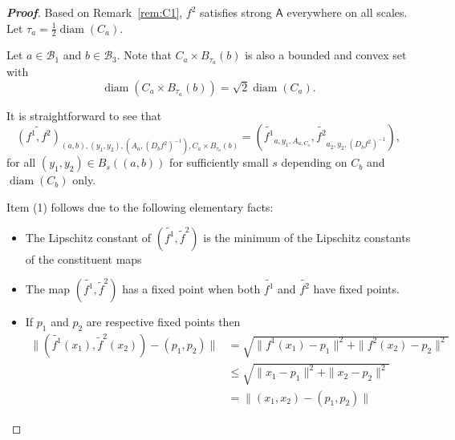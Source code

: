 \documentclass[a4, 12pt,leqno]{amsart}
\theoremstyle{plain}
\theoremstyle{definition}
\theoremstyle{remark}
\numberwithin{equation}{section}
\newcommand{\B}{\mathcal{B}}
\DeclareMathOperator{\diam}{diam}		%
\begin{document}
\begin{proof}[\footnotesize \textbf{Proof}]

\par Based on Remark~\ref{rem:C1}, $f^2$ satisfies strong $\textsf{A}$ everywhere on all scales. Let $\tau_a = \frac{1}{2}\diam(C_a)$. 

\par Let $a \in \B_1$ and $b \in \B_3$. 
Note that $C_a \times B_{\tau_a}(b)$ is also a bounded and convex set with 
\[
\diam\left( C_a \times B_{\tau_a}(b) \right) = \sqrt{2}\diam\left(C_{a} \right).
\]


\par It is straightforward to see that
\[
\widetilde{(f^1,f^2)}_{(a,b), (y_1,y_2), (A_{a}, (D_bf^2)^{-1}), C_{a}\times B_{\tau_a}(b)} = \left(\widetilde{f^1}_{a,y_1,A_{a,C_{a}}}, \widetilde{f^2}_{a_2,y_2,(D_bf^2)^{-1}} \right),
\] 
for all $(y_1,y_2) \in B_{s}((a,b))$ for sufficiently small $s$ depending on $C_b$ and $\diam(C_b)$ only.  

\par Item (1) follows due to the following elementary facts: 
\begin{itemize}
	\item The Lipschitz constant of $(\tilde{f^1}, \tilde{f}^2)$ is the minimum of the Lipschitz constants of the constituent maps
	\item The map $(\tilde{f^1}, \tilde{f}^2)$ has a fixed point when both $\tilde{f^1}$ and $\tilde{f^2}$ have fixed points.
	\item If $p_1$ and $p_2$ are respective fixed points then
	\begin{align*}
	\|(\tilde{f^1}(x_1), \tilde{f}^2(x_2)) - (p_1,p_2) \| &= \sqrt{\|f^1(x_1)- p_1\|^2 + \|f^2(x_2) - p_2\|^2} \\
	&\le \sqrt{\|x_1- p_1\|^2 + \|x_2 - p_2\|^2}\\
	& = \|(x_1,x_2) - (p_1,p_2)\|
	\end{align*}
\end{itemize}
 

\end{proof}
\end{document}
